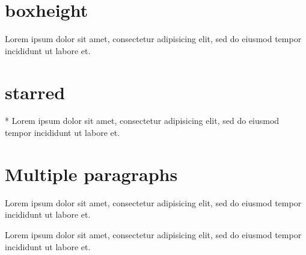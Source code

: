 \documentclass{article}
\begin{document}
\section{boxheight}

\clozereset

\begin{clozebox}[boxwidth=5cm,boxheight=5cm]
Lorem ipsum dolor sit amet, consectetur adipisicing elit, sed do eiusmod
tempor incididunt ut labore et.
\end{clozebox}

\section{starred}

\begin{clozebox}*
Lorem ipsum dolor sit amet, consectetur adipisicing elit, sed do eiusmod
tempor incididunt ut labore et.
\end{clozebox}

\section{Multiple paragraphs}

\begin{clozebox}
Lorem ipsum dolor sit amet, consectetur adipisicing elit, sed do eiusmod
tempor incididunt ut labore et.

Lorem ipsum dolor sit amet, consectetur adipisicing elit, sed do eiusmod
tempor incididunt ut labore et.
\end{clozebox}
\end{document}
